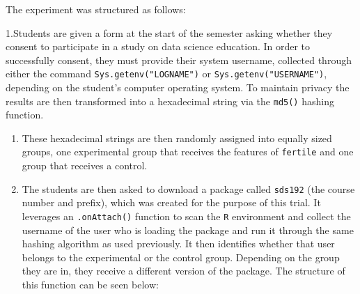 \documentclass[12pt,twoside]{reedthesis}
\begin{document}
The experiment was structured as follows:

1.Students are given a form at the start of the semester asking whether they consent to participate in a study on data science education. In order to successfully consent, they must provide their system username, collected through either the command \texttt{Sys.getenv("LOGNAME")} or \texttt{Sys.getenv("USERNAME")}, depending on the student's computer operating system. To maintain privacy the results are then transformed into a hexadecimal string via the \texttt{md5()} hashing function.
\begin{enumerate}
\def\labelenumi{\arabic{enumi}.}
\setcounter{enumi}{1}
\item
  These hexadecimal strings are then randomly assigned into equally sized groups, one experimental group that receives the features of \texttt{fertile} and one group that receives a control.
\item
  The students are then asked to download a package called \texttt{sds192} (the course number and prefix), which was created for the purpose of this trial. It leverages an \texttt{.onAttach()} function to scan the \texttt{R} environment and collect the username of the user who is loading the package and run it through the same hashing algorithm as used previously. It then identifies whether that user belongs to the experimental or the control group. Depending on the group they are in, they receive a different version of the package. The structure of this function can be seen below:
\end{enumerate}
\end{document}

